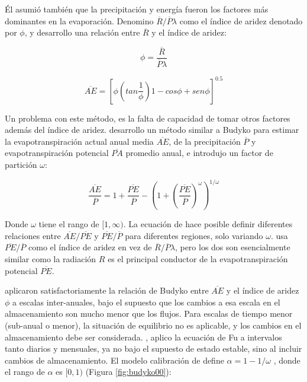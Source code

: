 \documentclass[12pt]{article}
\begin{document}
Él asumió también que la precipitación y energía fueron los factores más dominantes en la evaporación. Denomino $\overline{R}/\overline{P}\lambda$ como el índice de aridez denotado por $\phi$, y desarrollo una relación entre $\overline{R}$ y el índice de aridez:

\begin{equation}
\phi = \frac{\overline{R}}{\overline{P}\lambda}
\end{equation}

\begin{equation}
\overline{AE} = \left [ \phi\left ( tan\frac{1}{\phi}  \right )1 - cos\phi + sen\phi \right ]^{0.5}
\end{equation}

Un problema con este método, es la falta de capacidad de tomar otros factores además del índice de aridez. \citet{Fu1981} desarrollo un método similar a Budyko para estimar la evapotranspiración actual anual media $\overline{AE}$, de la precipitación $\overline{P}$ y evapotranspiración potencial $\overline{PA}$ promedio anual, e introdujo un factor de partición $\omega$: 

\begin{equation}
\frac{\overline{AE}}{\overline{P}} = 1 + \frac{\overline{PE}}{\overline{P}} - \left (1 + \left ( \frac{\overline{PE}}{\overline{P}} \right )^{\omega}  \right )^{1/\omega}
\label{equ:fuEqu}
\end{equation}

Donde $\omega$ tiene el rango de $[1,\infty)$. La ecuación de \citet{Fu1981} hace posible definir diferentes relaciones entre $\overline{AE}/\overline{PE}$ y $\overline{PE}/\overline{P}$ para diferentes regiones, solo variando $\omega$. \citet{Fu1981} usa $\overline{PE}/\overline{P}$ como el índice de aridez en vez de $\overline{R}/\overline{P}\lambda$, pero los dos son esencialmente similar como la radiación $R$ es el principal conductor de la evapotranspiración potencial $\overline{PE}$.

\citet{Koster1999} aplicaron satisfactoriamente la relación de Budyko entre $\overline{AE}$ y el índice de aridez $\phi$ a escalas inter-anuales, bajo el supuesto que los cambios a esa escala en el almacenamiento son mucho menor que los flujos. Para escalas de tiempo menor (sub-anual o menor), la situación de equilibrio no es aplicable, y los cambios en el almacenamiento debe ser considerada. \citet{Zhang2008}, aplico la ecuación de Fu a intervalos tanto diarios y mensuales, ya no bajo el supuesto de estado estable, sino al incluir cambios de almacenamiento. El modelo calibración de \citet{Zhang2008} define $\alpha = 1 - 1/\omega$ , donde el rango de $\alpha$ es $[0,1)$ (Figura \ref{fig:budyko00}):
\end{document}
